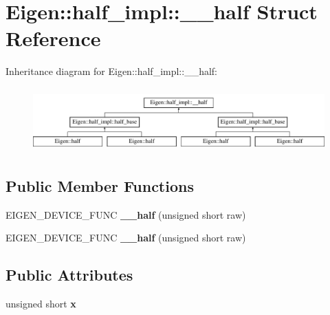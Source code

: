 \hypertarget{struct_eigen_1_1half__impl_1_1____half}{}\section{Eigen\+:\+:half\+\_\+impl\+:\+:\+\_\+\+\_\+half Struct Reference}
\label{struct_eigen_1_1half__impl_1_1____half}
Inheritance diagram for Eigen\+:\+:half\+\_\+impl\+:\+:\+\_\+\+\_\+half\+:\begin{figure}[H]
\begin{center}
\leavevmode
\includegraphics[height=2.485207cm]{struct_eigen_1_1half__impl_1_1____half}
\end{center}
\end{figure}
\subsection*{Public Member Functions}
\begin{DoxyCompactItemize}
\item 
\mbox{\label{struct_eigen_1_1half__impl_1_1____half_a33f3c4cf7cb73ff280728b21cd224b51}} 
E\+I\+G\+E\+N\+\_\+\+D\+E\+V\+I\+C\+E\+\_\+\+F\+U\+NC {\bfseries \+\_\+\+\_\+half} (unsigned short raw)
\item 
\mbox{\label{struct_eigen_1_1half__impl_1_1____half_a33f3c4cf7cb73ff280728b21cd224b51}} 
E\+I\+G\+E\+N\+\_\+\+D\+E\+V\+I\+C\+E\+\_\+\+F\+U\+NC {\bfseries \+\_\+\+\_\+half} (unsigned short raw)
\end{DoxyCompactItemize}
\subsection*{Public Attributes}
\begin{DoxyCompactItemize}
\item 
\mbox{\label{struct_eigen_1_1half__impl_1_1____half_a84b54fd1419c8250692f7375ae3a0745}} 
unsigned short {\bfseries x}
\end{DoxyCompactItemize}


